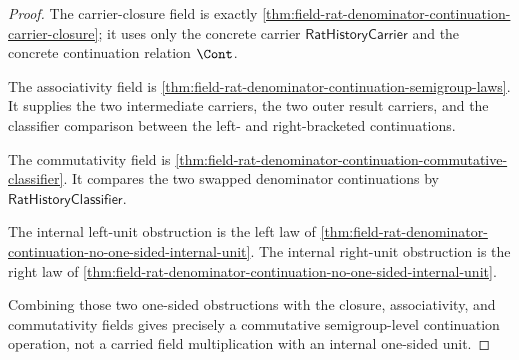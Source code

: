 \begin{proof}
The carrier-closure field is exactly
\autoref{thm:field-rat-denominator-continuation-carrier-closure}; it uses only
the concrete carrier $\mathsf{RatHistoryCarrier}$ and the concrete continuation
relation $\Cont$.

The associativity field is
\autoref{thm:field-rat-denominator-continuation-semigroup-laws}. It supplies the
two intermediate carriers, the two outer result carriers, and the classifier
comparison between the left- and right-bracketed continuations.

The commutativity field is
\autoref{thm:field-rat-denominator-continuation-commutative-classifier}. It
compares the two swapped denominator continuations by
$\mathsf{RatHistoryClassifier}$.

The internal left-unit obstruction is the left law of
\autoref{thm:field-rat-denominator-continuation-no-one-sided-internal-unit}.
The internal right-unit obstruction is the right law of
\autoref{thm:field-rat-denominator-continuation-no-one-sided-internal-unit}.

Combining those two one-sided obstructions with the closure, associativity, and
commutativity fields gives precisely a commutative semigroup-level continuation
operation, not a carried field multiplication with an internal one-sided unit.
\end{proof}

